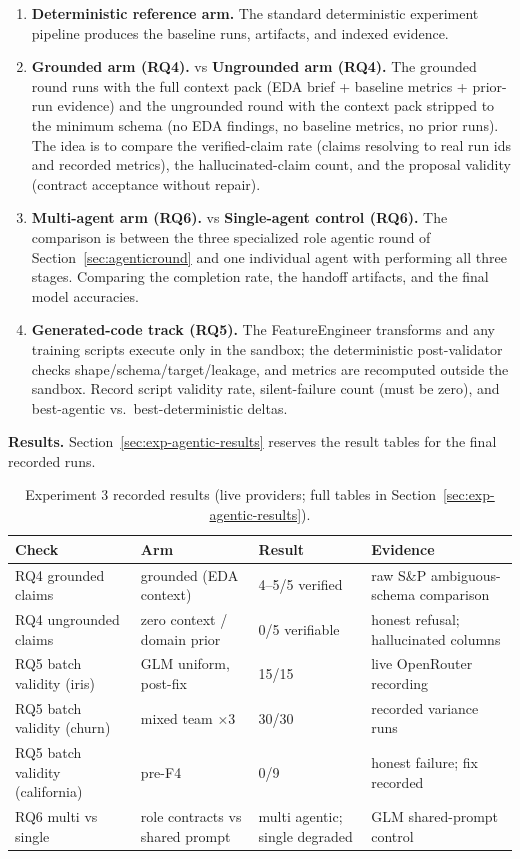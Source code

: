 \begin{enumerate}
	\item \textbf{Deterministic reference arm.} The standard deterministic experiment pipeline produces the baseline runs, artifacts, and indexed evidence.
	\item \textbf{Grounded arm (RQ4).} vs \textbf{Ungrounded arm (RQ4).} The grounded round runs with the full context pack (EDA brief + baseline metrics + prior-run evidence) and the ungrounded round with the context pack stripped to the minimum schema (no EDA findings, no baseline metrics, no prior runs). The idea is to compare the verified-claim rate (claims resolving to real run ids and recorded metrics), the hallucinated-claim count, and the proposal validity (contract acceptance without repair).
	\item \textbf{Multi-agent arm (RQ6).} vs \textbf{Single-agent control (RQ6).} The comparison is between the three specialized role agentic round of Section~\ref{sec:agenticround} and one individual agent with performing all three stages. Comparing the completion rate, the handoff artifacts, and the final model accuracies.
	\item \textbf{Generated-code track (RQ5).} The FeatureEngineer transforms and any training scripts execute only in the sandbox; the deterministic post-validator checks shape/schema/target/leakage, and metrics are recomputed outside the sandbox. Record script validity rate, silent-failure count (must be zero), and best-agentic vs.\ best-deterministic deltas.
\end{enumerate}


\textbf{Results.} Section~\ref{sec:exp-agentic-results} reserves the result tables for the final recorded runs.

\begin{table}[H]
\centering
\caption{Experiment 3 recorded results (live providers; full tables in Section~\ref{sec:exp-agentic-results}).}
\label{tab:exp3-summary}
\small
\begin{tabular}{p{4.6cm}p{3.4cm}p{2.4cm}p{3.6cm}}
\toprule
\textbf{Check} & \textbf{Arm} & \textbf{Result} & \textbf{Evidence} \\
\midrule
RQ4 grounded claims & grounded (EDA context) & 4--5/5 verified & raw S\&P ambiguous-schema comparison \\
RQ4 ungrounded claims & zero context / domain prior & 0/5 verifiable & honest refusal; hallucinated columns \\
RQ5 batch validity (iris) & GLM uniform, post-fix & 15/15 & live OpenRouter recording \\
RQ5 batch validity (churn) & mixed team $\times$3 & 30/30 & recorded variance runs \\
RQ5 batch validity (california) & pre-F4 & 0/9 & honest failure; fix recorded \\
RQ6 multi vs single & role contracts vs shared prompt & multi agentic; single degraded & GLM shared-prompt control \\
\bottomrule
\end{tabular}
\end{table}

